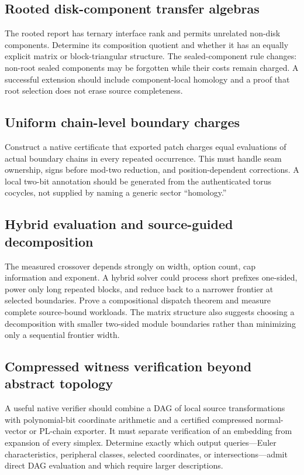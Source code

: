 \documentclass[11pt,a4paper]{article}
\theoremstyle{definition}
\begin{document}
\subsection{Rooted disk-component transfer algebras}
The rooted report has ternary interface rank and permits unrelated non-disk components. Determine its composition quotient and whether it has an equally explicit matrix or block-triangular structure. The sealed-component rule changes: non-root sealed components may be forgotten while their costs remain charged. A successful extension should include component-local homology and a proof that root selection does not erase source completeness.

\subsection{Uniform chain-level boundary charges}
Construct a native certificate that exported patch charges equal evaluations of actual boundary chains in every repeated occurrence. This must handle seam ownership, signs before mod-two reduction, and position-dependent corrections. A local two-bit annotation should be generated from the authenticated torus cocycles, not supplied by naming a generic sector ``homology.''

\subsection{Hybrid evaluation and source-guided decomposition}
The measured crossover depends strongly on width, option count, cap information and exponent. A hybrid solver could process short prefixes one-sided, power only long repeated blocks, and reduce back to a narrower frontier at selected boundaries. Prove a compositional dispatch theorem and measure complete source-bound workloads. The matrix structure also suggests choosing a decomposition with smaller two-sided module boundaries rather than minimizing only a sequential frontier width.

\subsection{Compressed witness verification beyond abstract topology}
A useful native verifier should combine a DAG of local source transformations with polynomial-bit coordinate arithmetic and a certified compressed normal-vector or PL-chain exporter. It must separate verification of an embedding from expansion of every simplex. Determine exactly which output queries---Euler characteristics, peripheral classes, selected coordinates, or intersections---admit direct DAG evaluation and which require larger descriptions.
\end{document}
